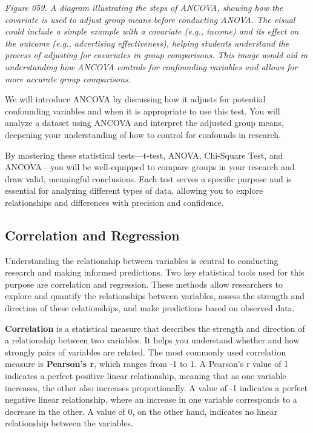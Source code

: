 \documentclass[
]{book}
\begin{document}
\emph{Figure 059. A diagram illustrating the steps of ANCOVA, showing how the covariate is used to adjust group means before conducting ANOVA. The visual could include a simple example with a covariate (e.g., income) and its effect on the outcome (e.g., advertising effectiveness), helping students understand the process of adjusting for covariates in group comparisons. This image would aid in understanding how ANCOVA controls for confounding variables and allows for more accurate group comparisons.}

We will introduce ANCOVA by discussing how it adjusts for potential confounding variables and when it is appropriate to use this test. You will analyze a dataset using ANCOVA and interpret the adjusted group means, deepening your understanding of how to control for confounds in research.

By mastering these statistical tests---t-test, ANOVA, Chi-Square Test, and ANCOVA---you will be well-equipped to compare groups in your research and draw valid, meaningful conclusions. Each test serves a specific purpose and is essential for analyzing different types of data, allowing you to explore relationships and differences with precision and confidence.

\subsection{Correlation and Regression}\label{correlation-and-regression}

Understanding the relationship between variables is central to conducting research and making informed predictions. Two key statistical tools used for this purpose are correlation and regression. These methods allow researchers to explore and quantify the relationships between variables, assess the strength and direction of these relationships, and make predictions based on observed data.

\textbf{Correlation} is a statistical measure that describes the strength and direction of a relationship between two variables. It helps you understand whether and how strongly pairs of variables are related. The most commonly used correlation measure is \textbf{Pearson's r}, which ranges from -1 to 1. A Pearson's r value of 1 indicates a perfect positive linear relationship, meaning that as one variable increases, the other also increases proportionally. A value of -1 indicates a perfect negative linear relationship, where an increase in one variable corresponds to a decrease in the other. A value of 0, on the other hand, indicates no linear relationship between the variables.
\end{document}
